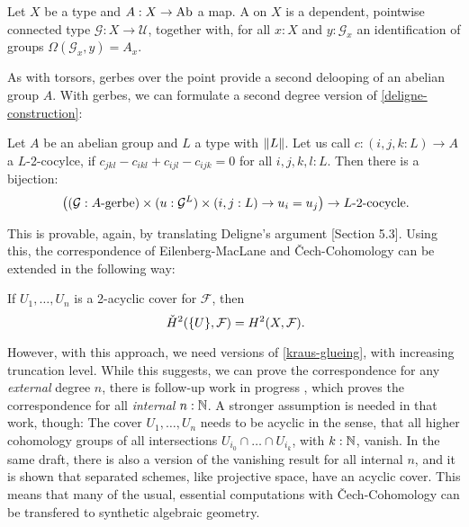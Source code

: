 \begin{definition}
  \label{gerbe}
  Let $X$ be a type and $A:X\to \operatorname{Ab}$ a map.
  A  on $X$ is a dependent, pointwise connected type $\mathcal G:X\to \mathcal U$,
  together with, for all $x:X$ and $y:\mathcal G_x$ an identification of groups $\Omega (\mathcal G_x,y)=A_x$.
\end{definition}

As with torsors, gerbes over the point provide a second delooping of an abelian group $A$.
With gerbes, we can formulate a second degree version of \cref{deligne-construction}:

\begin{theorem}
  \label{deligne-construction-gerbes}
  Let $A$ be an abelian group and $L$ a type with $\lVert L \rVert$.
  Let us call $c:(i,j,k : L)\to A$ a $L$-2-cocylce,
  if $c_{jkl}-c_{ikl}+c_{ijl}-c_{ijk}=0$ for all $i,j,k,l : L$.
  Then there is a bijection:
  \[
    \left((\mathcal G:\text{$A$-gerbe})\times (u:\mathcal G^{L})\times (i,j : L) \to u_i=u_j\right) \to \text{$L$-2-cocycle}
    \rlap{.}
  \]
\end{theorem}

This is provable, again, by translating Deligne's argument \cite{Deligne91}[Section 5.3].
Using this, the correspondence of Eilenberg-MacLane and \v{C}ech-Cohomology can be extended in the following way:

\begin{theorem}
  If $U_1,\dots,U_n$ is a 2-acyclic cover for $\mathcal F$, then
  \[
    \check{H}^2(\{U\},\mathcal F)=H^2(X,\mathcal F)\rlap{.}
  \]  
\end{theorem}

However, with this approach, we need versions of \cref{kraus-glueing}, with increasing truncation level.
While this suggests, we can prove the correspondence for any \emph{external} degree $n$,
there is follow-up work in progress \cite{chech-draft},
which proves the correspondence for all \emph{internal} $n:\mathbb{N}$.
A stronger assumption is needed in that work, though: The cover $U_1,\dots,U_n$ needs to be acyclic in the sense,
that all higher cohomology groups of all intersections $U_{i_0}\cap \dots \cap U_{i_k}$, with $k:\mathbb{N}$, vanish.
In the same draft, there is also a version of the vanishing result for all internal $n$,
and it is shown that separated schemes, like projective space, have an acyclic cover.
This means that many of the usual, essential computations with \v{C}ech-Cohomology can be transfered to synthetic algebraic geometry.